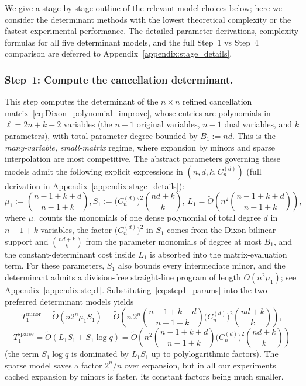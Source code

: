 We give a stage-by-stage outline of the relevant model choices below; here we consider the determinant methods with the lowest theoretical complexity or the fastest experimental performance. The detailed parameter derivations, complexity formulas for all five determinant models, and the full Step~1 vs Step~4 comparison are deferred to Appendix~\ref{appendix:stage_details}.

\subsubsection{Step~1: Compute the cancellation determinant.}
This step computes the determinant of the $n\times n$ refined cancellation matrix~\eqref{eq:Dixon_polynomial_improve}, whose entries are polynomials in $\ell=2n+k-2$ variables (the $n-1$ original variables, $n-1$ dual variables, and $k$ parameters), with total parameter-degree bounded by $B_1:=nd$. This is the \emph{many-variable, small-matrix} regime, where expansion by minors and sparse interpolation are most competitive. The abstract parameters governing these models admit the following explicit expressions in $(n,d,k,C_n^{(d)})$ (full derivation in Appendix~\ref{appendix:stage_details}):
\begin{equation}
		\mu_1 := \binom{n-1+k+d}{n-1+k},\!
		S_1 := \bigl(C_n^{(d)}\bigr)^2\binom{nd+k}{k},\,
	L_1 = \widetilde{O}\!\left(n^2\binom{n-1+k+d}{n-1+k}\right),
	\label{eq:step1_params}
\end{equation}
where $\mu_1$ counts the monomials of one dense polynomial of total degree $d$ in $n-1+k$ variables, the factor $\bigl(C_n^{(d)}\bigr)^2$ in $S_1$ comes from the Dixon bilinear support and $\binom{nd+k}{k}$ from the parameter monomials of degree at most $B_1$, and the constant-determinant cost inside $L_1$ is absorbed into the matrix-evaluation term. For these parameters, $S_1$ also bounds every intermediate minor, and the determinant admits a division-free straight-line program of length $O(n^2\mu_1)$; see Appendix~\ref{appendix:step1}. Substituting~\eqref{eq:step1_params} into the two preferred determinant models yields
\begin{equation}
	T_{1}^{\mathrm{minor}}  = \widetilde{O}(n2^n\mu_1S_1) = \widetilde{O}\!\left(n\,2^n\binom{n-1+k+d}{n-1+k}\bigl(C_n^{(d)}\bigr)^2\binom{nd+k}{k}\right),
	\label{eq:step1_minor}
\end{equation}
\begin{equation}
	T_{1}^{\mathrm{sparse}} = \widetilde{O}(L_1S_1 + S_1\log q) = \widetilde{O}\!\left(n^2\binom{n-1+k+d}{n-1+k}\bigl(C_n^{(d)}\bigr)^2\binom{nd+k}{k}\right)
	\label{eq:step1_sparse}
\end{equation}
(the term $S_1\log q$ is dominated by $L_1S_1$ up to polylogarithmic factors). The sparse model saves a factor $2^n/n$ over expansion, but in all our experiments cached expansion by minors is faster, its constant factors being much smaller.

